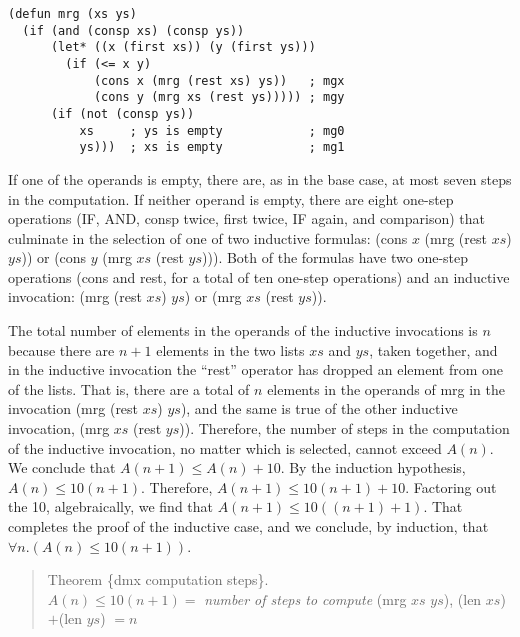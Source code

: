 \label{defun:mrg-copy}
\begin{Verbatim}
(defun mrg (xs ys)
  (if (and (consp xs) (consp ys))
      (let* ((x (first xs)) (y (first ys)))
        (if (<= x y)
            (cons x (mrg (rest xs) ys))   ; mgx
            (cons y (mrg xs (rest ys))))) ; mgy
      (if (not (consp ys))
          xs     ; ys is empty            ; mg0
          ys)))  ; xs is empty            ; mg1
\end{Verbatim}

If one of the operands is empty, there are, as in the base case,
at most seven steps in the computation.
If neither operand is empty, there are eight one-step operations
(IF, AND, consp twice, first twice, IF again, and comparison)
that culminate in the selection of
one of two inductive formulas: (cons $x$ (mrg (rest $xs$) $ys$))
or (cons $y$ (mrg $xs$ (rest $ys$))).
Both of the formulas have two one-step operations (cons and rest,
for a total of ten one-step operations)
and an inductive invocation:
(mrg (rest $xs$) $ys$) or (mrg $xs$ (rest $ys$)).

The total number of elements in the operands of the inductive invocations
is $n$ because there are $n+1$ elements in the two lists $xs$ and $ys$,
taken together, and in the inductive invocation the ``rest'' operator has
dropped an element from one of the lists.
That is, there are a total of $n$ elements in the operands of mrg
in the invocation (mrg (rest $xs$) $ys$),
and the same is true of the other inductive invocation, (mrg $xs$ (rest $ys$)).
Therefore, the number of steps in the computation of the inductive invocation,
no matter which is selected, cannot exceed $A(n)$.
We conclude that $A(n+1) \leq A(n) + 10$.
By the induction hypothesis, $A(n) \leq 10(n+1)$.
Therefore, $A(n+1) \leq 10(n+1) + 10$.
Factoring out the 10, algebraically,
we find that $A(n+1) \leq 10((n+1) + 1)$.
That completes the proof of the inductive case,
and we conclude, by induction, that $\forall n.(A(n) \leq 10(n+1))$.

\label{thm:mrg-computation-time}
\begin{quote}
Theorem \{dmx computation steps\}. \\
$A(n) \leq 10(n+1) =$ \emph{number of steps to compute}
(mrg $xs$ $ys$), (len $xs$)$+$(len $ys$) $= n$
\end{quote}

